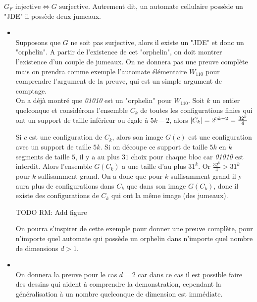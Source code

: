 \begin{theorem}
	$G_F \text{ injective} \iff G \text{ surjective}$. Autrement dit, un automate cellulaire possède un "JDE" \ssi il possède deux jumeaux.
\end{theorem}



\begin{proofI}
	\begin{itemize}
		\item \bimpLR\\
		      Supposons que $G$ ne soit pas surjective, alors il existe un "JDE" et donc un "orphelin".
		      A partir de l'existence de cet "orphelin", on doit montrer l'existence d'un couple de jumeaux.
		      On ne donnera pas une preuve complète mais on prendra comme exemple l'automate élémentaire $W_{110}$ pour
		      comprendre l'argument de la preuve, qui est un simple argument de comptage.\\
		      On a déjà montré que \emph{01010} est un "orphelin" pour $W_{110}$. Soit $k$ un entier quelconque
		      et considérons  l'ensemble $C_k$ de toutes les configurations finies qui ont un support de taille
		      inférieur ou égale à $5k-2$, alors $\left|C_k\right| = 2^{5k-2} = \frac {32^k} 4$

		      Si $c$ est une configuration de $C_k$, alors son image $G(c)$ est une configuration avec un support de taille $5k$.
		      Si on découpe ce support de taille $5k$ en $k$ segments de taille $5$, il y a au plus $31$ choix pour chaque bloc car
		      \emph{01010} est interdit. Alors l'ensemble $G(C_k)$ a une taille d'au plus $31^k$.
		      Or $\frac {32^k} 4 > 31 ^ k$ pour  $k$ suffisamment grand. On a donc que pour $k$ suffisamment grand
		      il y aura plus de configurations
		      dans $C_k$ que dans son image $G(C_k)$, donc il existe des configurations de
		      $C_k$ qui ont la même image (des jumeaux).

		      TODO RM: Add figure

		      On pourra s'inspirer de cette exemple pour donner une preuve complète, pour n'importe quel automate qui possède un
		      orphelin dans n'importe
		      quel nombre de dimensions $d > 1$.


		\item \bimpRL\\
		      On donnera la preuve pour le cas $d=2$ car dans ce cas il est possible faire des dessins qui aident à
		      comprendre la demonstration, cependant la généralisation à un nombre quelconque de dimension est immédiate.


\end{itemize}
\end{proofI}
